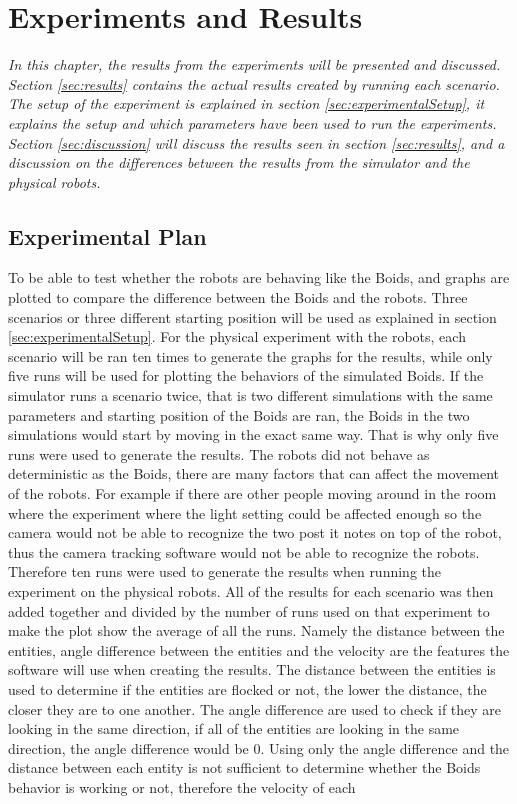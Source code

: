 \chapter{Experiments and Results}
\label{cha:ResearchAndResults}

{\it In this chapter, the results from the experiments will be presented and discussed. Section \ref{sec:results} contains the actual results created by running each scenario. The setup of the experiment is explained in section \ref{sec:experimentalSetup}, it explains the setup and which parameters have been used to run the experiments.
Section \ref{sec:discussion} will discuss the results seen in section \ref{sec:results}, and a discussion on the differences between the results from the simulator and the physical robots.}

\section{Experimental Plan}
\label{sec:experimentalPlan}
To be able to test whether the robots are behaving like the Boids, and graphs are plotted to compare the difference between the Boids and the robots. 
Three scenarios or three different starting position will be used as explained in section \ref{sec:experimentalSetup}.
For the physical experiment with the robots, each scenario will be ran ten times to generate the graphs for the results, while only five runs will be used for plotting the behaviors of the simulated Boids. 
If the simulator runs a scenario twice, that is two different simulations with the same parameters and starting position of the Boids are ran, the Boids in the two simulations would start by moving in the exact same way. That is why only five runs were used to generate the results.
The robots did not behave as deterministic as the Boids, there are many factors that can affect the movement of the robots. For example if there are other people moving around in the room where the experiment where the light setting could be affected enough so the camera would not be able to recognize the two post it notes on top of the robot, thus the camera tracking software would not be able to recognize the robots.
Therefore ten runs were used to generate the results when running the experiment on the physical robots. 
All of the results for each scenario was then added together and divided by the number of runs used on that experiment to make the plot show the average of all the runs.
Namely the distance between the entities, angle difference between the entities and the velocity are the features the software will use when creating the results.
The distance between the entities is used to determine if the entities are flocked or not, the lower the distance, the closer they are to one another.
The angle difference are used to check if they are looking in the same direction, if all of the entities are looking in the same direction, the angle difference would be 0.
Using only the angle difference and the distance between each entity is not sufficient to determine whether the Boids behavior is working or not, therefore the velocity of each

